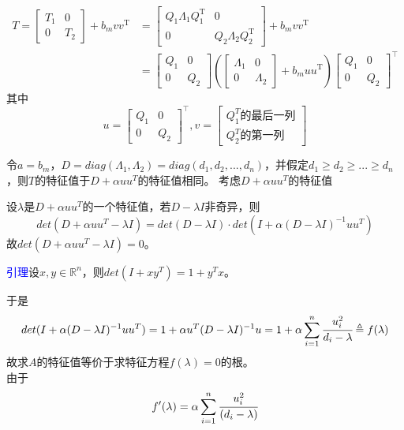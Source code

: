 \documentclass[12pt,a4paper]{article}
\begin{document}
$$
\begin{aligned} T=\left[\begin{array}{cc}{T_{1}} & {0} \\ {0} & {T_{2}}\end{array}\right]+b_{m} v v^{\mathrm{T}} &=\left[\begin{array}{cc}{Q_{1} \Lambda_{1} Q_{1}^{\mathrm{T}}} & {0} \\ {0} & {Q_{2} \Lambda_{2} Q_{2}^{\mathrm{T}}}\end{array}\right]+b_{m} v v^{\mathrm{T}} \\ &=\left[\begin{array}{cc}{Q_{1}} & {0} \\ {0} & {Q_{2}}\end{array}\right]\left(\left[\begin{array}{cc}{\Lambda_{1}} & {0} \\ {0} & {\Lambda_{2}}\end{array}\right]+b_{m} u u^{\mathrm{T}}\right)\left[\begin{array}{cc}{Q_{1}} & {0} \\ {0} & {Q_{2}}\end{array}\right]^{\top} \end{aligned}
$$
其中$$
u=\left[\begin{array}{cc}{Q_{1}} & {0} \\ {0} & {Q_{2}}\end{array}\right]^{\top}
,v=\left[\begin{array}{c}
Q_1^T\mbox{的最后一列}\\Q_2^T\mbox{的第一列}
\end{array}\right]$$

令$a=b_m$，$D=diag(\Lambda_1,\Lambda_2)=diag(d_1,d_2,...,d_n)$，并假定$d_1\ge d_2\ge ...\ge d_n$，则$T$的特征值于$D+\alpha uu^T$的特征值相同。
考虑$D+\alpha uu^T$的特征值

设$\lambda$是$D+\alpha uu^T$的一个特征值，若$D-\lambda I$非奇异，则$$det(D+\alpha uu^T-\lambda I)=det(D-\lambda I)·det(I+\alpha(D-\lambda I)^{-1}uu^T)$$
故$det(D+\alpha uu^T-\lambda I)=0$。

\textcolor{blue}{引理}\quad 设$x,y\in \mathbb R^n$，则$det(I+xy^T)=1+y^Tx$。

于是$$det(I+\alpha(D-\lambda I)^{-1}uu^T)=1+\alpha u^T(D-\lambda I)^{-1}u=1+\alpha \sum_{i=1}^{n}\cfrac{u_i^2}{d_i-\lambda} \triangleq f(\lambda)$$
故求$A$的特征值等价于求特征方程$f(\lambda)=0$的根。\\
由于$$f'(\lambda)=\alpha \sum_{i=1}^{n}\cfrac{u_i^2}{(d_i-\lambda)}$$
\end{document}
